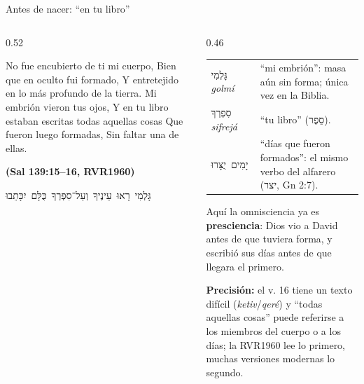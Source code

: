 \documentclass[hyperref={bookmarks=false},aspectratio=169]{beamer}
\newcommand{\heb}[1]{\mbox{\foreignlanguage{hebrew}{#1}}}
\newcommand{\fuente}[1]{\par\hfill{\upshape\bfseries\footnotesize\textcolor{azul}{#1}}}
\newcommand{\destacar}[1]{\textbf{\textcolor{azul}{#1}}}
\newcommand{\precision}[1]{{\footnotesize\color{gris}\textbf{Precisión:} #1}}
\begin{document}
\begin{frame}{Antes de nacer: ``en tu libro''}
\begin{columns}[t,onlytextwidth]
\begin{column}{0.52\textwidth}
\begin{cita}No fue encubierto de ti mi cuerpo, Bien que en oculto fui formado, Y entretejido en lo más profundo de la tierra. Mi embrión vieron tus ojos, Y en tu libro estaban escritas todas aquellas cosas Que fueron luego formadas, Sin faltar una de ellas.\fuente{(Sal 139:15--16, RVR1960)}\end{cita}
\begin{center}\heb{גָּלְמִי רָאוּ עֵינֶיךָ וְעַל־סִפְרְךָ כֻּלָּם יִכָּתֵבוּ}\end{center}
\end{column}
\begin{column}{0.46\textwidth}\scriptsize
\renewcommand{\arraystretch}{1.1}
\begin{tabular}{@{}>{\RaggedRight\arraybackslash}p{1.6cm}>{\RaggedRight\arraybackslash}p{3.7cm}@{}}
\toprule
\heb{גָּלְמִי} \emph{golmí} & ``mi embrión'': masa aún sin forma; única vez en la Biblia. \\
\heb{סִפְרְךָ} \emph{sifrejá} & ``tu libro'' (\heb{סֵפֶר}). \\
\heb{יָמִים יֻצָּרוּ} & ``días que fueron formados'': el mismo verbo del alfarero (\heb{יצר}, Gn 2:7). \\
\bottomrule
\end{tabular}\par\smallskip
\small Aquí la omnisciencia ya es \destacar{presciencia}: Dios vio a David antes de que tuviera forma, y escribió sus días antes de que llegara el primero.\par\smallskip
\precision{el v. 16 tiene un texto difícil (\emph{ketiv}/\emph{qeré}) y ``todas aquellas cosas'' puede referirse a los miembros del cuerpo o a los días; la RVR1960 lee lo primero, muchas versiones modernas lo segundo.}
\end{column}
\end{columns}
\end{frame}
\end{document}
